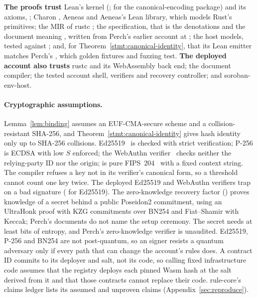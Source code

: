 \begin{perchbox}
\textbf{The proofs trust} Lean's kernel (;
 for the canonical-encoding package) and its axioms,
; Charon , Aeneas  and
Aeneas's Lean library, which models Rust's primitives; the MIR of rustc
; the specification, that is the denotations and the
document meaning , written from Perch's earlier account at
; the host models, tested against
; and, for
Theorem~\ref{stmt:canonical-identity}, that its Lean emitter matches Perch's
, which golden fixtures and fuzzing test. \textbf{The deployed
account also trusts} rustc  and its WebAssembly back end; the
document compiler; the tested account shell, verifiers and recovery controller;
and soroban-env-host.
\end{perchbox}

\paragraph{Cryptographic assumptions.} Lemma~\ref{lem:binding} assumes an
EUF-CMA-secure scheme and a collision-resistant SHA-256, and
Theorem~\ref{stmt:canonical-identity} gives hash identity only up to SHA-256
collisions. Ed25519~\cite{rfc8032} is checked with strict verification; P-256 is
ECDSA with low $S$ enforced; the WebAuthn verifier~\cite{webauthn2} checks
neither the relying-party ID nor the origin;  is pure
FIPS~204~\cite{fips204} with a fixed context string. The compiler refuses a key
not in its verifier's canonical form, so a threshold cannot count one key twice.
The deployed Ed25519 and WebAuthn verifiers trap on a bad signature
( for Ed25519). The zero-knowledge recovery factor
() proves knowledge of a secret behind a public Poseidon2
commitment, using an UltraHonk proof with KZG commitments over BN254 and
Fiat--Shamir with Keccak; Perch's documents do not name the setup ceremony. The
secret needs at least  bits of entropy, and Perch's
zero-knowledge verifier is unaudited. Ed25519, P-256 and BN254 are not
post-quantum, so an  signer resists a quantum adversary only
if every path that can change the account's rules does. A contract ID commits to
its deployer and salt, not its code, so calling fixed infrastructure code assumes
that the registry deploys each pinned Wasm hash at the salt derived from it and
that those contracts cannot replace their code. rule-core's claims ledger lists
its  assumed and  unproven claims
(Appendix~\ref{sec:reproduce}).

